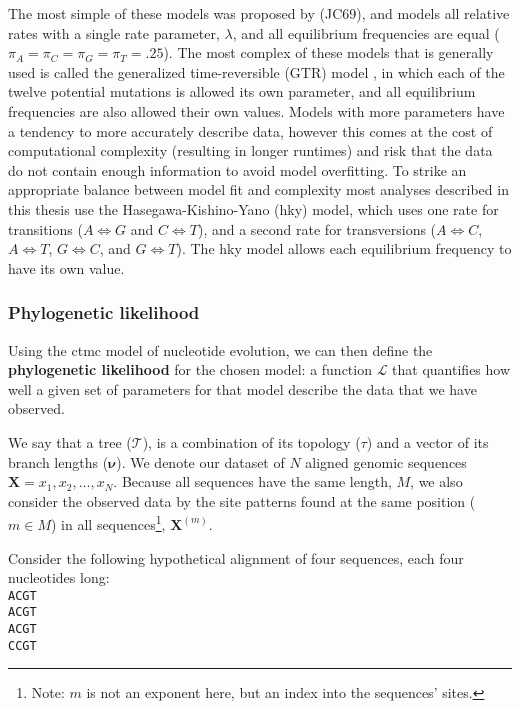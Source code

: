 The most simple of these models was proposed by \citet{jukes1969evolution} (JC69), and models all relative rates with a single rate parameter, $\lambda$, and all equilibrium frequencies are equal ($\pi_A = \pi_C = \pi_G = \pi_T = .25$).
The most complex of these models that is generally used is called the generalized time-reversible (GTR) model \citep{tavare1986some}, in which each of the twelve potential mutations is allowed its own parameter, and all equilibrium frequencies are also allowed their own values.
Models with more parameters have a tendency to more accurately describe data, however this comes at the cost of computational complexity (resulting in longer runtimes) and risk that the data do not contain enough information to avoid model overfitting.
To strike an appropriate balance between model fit and complexity most analyses described in this thesis use the Hasegawa-Kishino-Yano (\gls{hky}) \citep{hasegawa1985dating} model, which uses one rate for transitions ($A \iff G$ and $C \iff T$), and a second rate for transversions ($A \iff C$, $A \iff T$, $G \iff C$, and $G \iff T$).
The \gls{hky} model allows each equilibrium frequency to have its own value.

\subsubsection{Phylogenetic likelihood}
Using the \gls{ctmc} model of nucleotide evolution, we can then define the \textbf{phylogenetic likelihood} for the chosen model: a function $\mathcal{L}$ that quantifies how well a given set of parameters for that model describe the data that we have observed.

We say that a tree ($\mathcal{T}$), is a combination of its topology ($\tau$) and a vector of its branch lengths ($\mathbf{\nu}$).
We denote our dataset of $N$ aligned genomic sequences $\mathbf{X} = {x_1, x_2, \dots, x_N}$.
Because all sequences have the same length, $M$, we also consider the observed data by the site patterns found at the same position ($m \in M$) in all sequences\footnote{Note: $m$ is not an exponent here, but an index into the sequences' sites.}, $\mathbf{X}^{(m)}$.

Consider the following hypothetical alignment of four sequences, each four nucleotides long:\\
\verb|ACGT|\\
\verb|ACGT|\\
\verb|ACGT|\\
\verb|CCGT|\\


